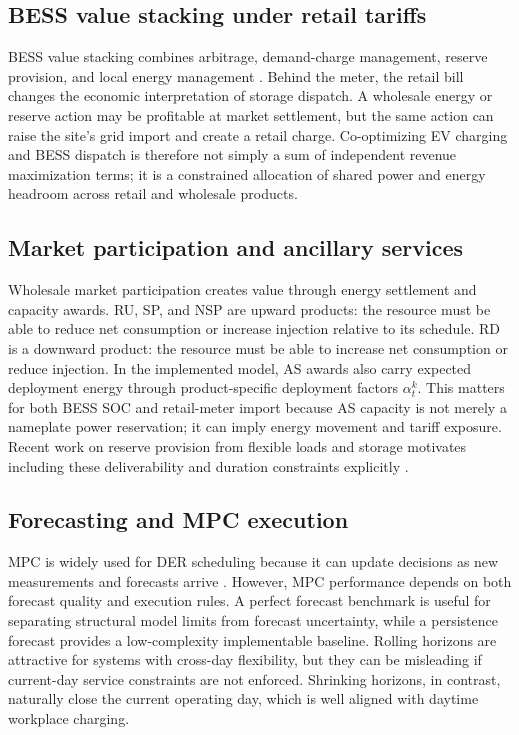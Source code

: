 \documentclass[final,5p,times]{elsarticle}
\begin{document}
\subsection{BESS value stacking under retail tariffs}

BESS value stacking combines arbitrage, demand-charge management, reserve provision, and local energy management \cite{callaway2011achieving,parisio2014model,wang2018predictive,ghosh2022battery,liu2022battery}. Behind the meter, the retail bill changes the economic interpretation of storage dispatch. A wholesale energy or reserve action may be profitable at market settlement, but the same action can raise the site's grid import and create a retail charge. Co-optimizing EV charging and BESS dispatch is therefore not simply a sum of independent revenue maximization terms; it is a constrained allocation of shared power and energy headroom across retail and wholesale products.

\subsection{Market participation and ancillary services}

Wholesale market participation creates value through energy settlement and capacity awards. RU, SP, and NSP are upward products: the resource must be able to reduce net consumption or increase injection relative to its schedule. RD is a downward product: the resource must be able to increase net consumption or reduce injection. In the implemented model, AS awards also carry expected deployment energy through product-specific deployment factors $\alpha_t^k$. This matters for both BESS SOC and retail-meter import because AS capacity is not merely a nameplate power reservation; it can imply energy movement and tariff exposure. Recent work on reserve provision from flexible loads and storage motivates including these deliverability and duration constraints explicitly \cite{thrane2024reserve}.

\subsection{Forecasting and MPC execution}

MPC is widely used for DER scheduling because it can update decisions as new measurements and forecasts arrive \cite{parisio2014model,wang2018predictive}. However, MPC performance depends on both forecast quality and execution rules. A perfect forecast benchmark is useful for separating structural model limits from forecast uncertainty, while a persistence forecast provides a low-complexity implementable baseline. Rolling horizons are attractive for systems with cross-day flexibility, but they can be misleading if current-day service constraints are not enforced. Shrinking horizons, in contrast, naturally close the current operating day, which is well aligned with daytime workplace charging.
\end{document}

